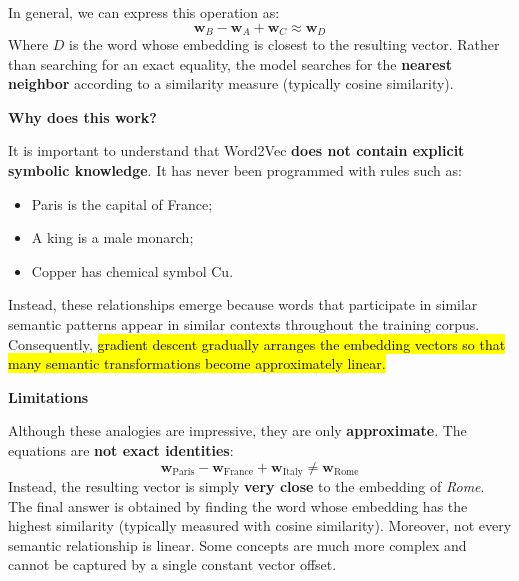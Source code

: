 \highspace
In general, we can express this operation as:
\begin{equation}
    \mathbf{w}_{B} - \mathbf{w}_{A} + \mathbf{w}_{C} \approx \mathbf{w}_{D}
\end{equation}
Where $D$ is the word whose embedding is closest to the resulting vector. Rather than searching for an exact equality, the model searches for the \textbf{nearest neighbor} according to a similarity measure (typically cosine similarity).

\highspace
\begin{flushleft}
    \textcolor{Green3}{ \textbf{Why does this work?}}
\end{flushleft}
It is important to understand that Word2Vec \textbf{does not contain explicit symbolic knowledge}. It has never been programmed with rules such as:
\begin{itemize}
    \item Paris is the capital of France;
    \item A king is a male monarch;
    \item Copper has chemical symbol Cu.
\end{itemize}
Instead, these relationships emerge because words that participate in similar semantic patterns appear in similar contexts throughout the training corpus. Consequently, \hl{gradient descent gradually arranges the embedding vectors so that many semantic transformations become approximately linear.}

\highspace
\begin{flushleft}
    \textcolor{Red2}{ \textbf{Limitations}}
\end{flushleft}
Although these analogies are impressive, they are only \textbf{approximate}. The equations are \textbf{not exact identities}:
\begin{equation*}
    \mathbf{w}_{\text{Paris}} - \mathbf{w}_{\text{France}} + \mathbf{w}_{\text{Italy}} \neq \mathbf{w}_{\text{Rome}}
\end{equation*}
Instead, the resulting vector is simply \textbf{very close} to the embedding of \emph{Rome}. The final answer is obtained by finding the word whose embedding has the highest similarity (typically measured with cosine similarity). Moreover, not every semantic relationship is linear. Some concepts are much more complex and cannot be captured by a single constant vector offset.